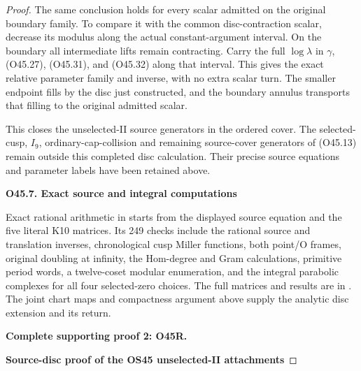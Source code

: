 \begin{proof}
The same conclusion holds for every scalar admitted
on the original boundary family. To compare it with
the common disc-contraction scalar, decrease its
modulus along the actual constant-argument interval.
On the boundary all intermediate lifts remain
contracting. Carry the full \(\log\lambda\) in
\(\gamma\), (O45.27), (O45.31), and (O45.32) along
that interval. This gives the exact relative
parameter family and inverse, with no extra scalar
turn. The smaller endpoint fills by the disc just
constructed, and the boundary annulus transports
that filling to the original admitted scalar.

This closes the unselected-II source generators in
the ordered cover. The selected-cusp, \(I_9\),
ordinary-cap-collision and remaining source-cover
generators of (O45.13) remain outside this completed
disc calculation. Their precise source equations
and parameter labels have been retained above.

\par

\medskip\noindent\textbf{O45.7. Exact source and integral computations}

\par\nobreak

Exact rational arithmetic in
starts from the displayed source equation and the five literal
K10 matrices. Its 249 checks include the rational source and
translation inverses, chronological cusp Miller functions,
both point/O frames, original doubling at infinity,
the Hom-degree and Gram calculations, primitive period words,
a twelve-coset modular enumeration, and the integral
parabolic complexes for all four selected-zero choices.
The full matrices and results are in
.
The joint chart maps and compactness argument above supply
the analytic disc extension and its return.



\par\bigskip\noindent\textbf{Complete supporting proof 2: O45R.}\par


\par

\medskip\noindent\textbf{Source-disc proof of the OS45 unselected-II attachments}


\end{proof}
